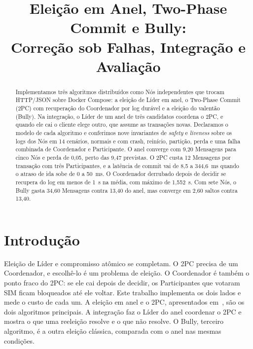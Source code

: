 \documentclass[conference]{IEEEtran}
\begin{document}
\title{Eleição em Anel, Two-Phase Commit e Bully:\\
Correção sob Falhas, Integração e Avaliação}

\author{
}

\maketitle

\begin{abstract}
Implementamos três algoritmos distribuídos como Nós independentes que trocam HTTP/JSON sobre
Docker Compose: a eleição de Líder em anel, o Two-Phase Commit (2PC) com recuperação do
Coordenador por log durável e a eleição do valentão (Bully). Na integração, o Líder de um anel de
três candidatos coordena o 2PC, e quando ele cai o cliente elege outro, que assume as transações
novas. Declaramos o modelo de cada algoritmo e conferimos nove invariantes de \emph{safety} e
\emph{liveness} sobre os logs dos Nós em 14 cenários, normais e com crash, reinício, partição,
perda e uma falha combinada de Coordenador e Participante. O anel converge com 9,20 Mensagens
para cinco Nós e perda de 0,05, perto das 9,47 previstas. O 2PC custa 12 Mensagens por transação
com três Participantes, e a latência de commit vai de 8,5 a 344,6~ms quando o atraso de ida sobe
de 0 a 50~ms. O Coordenador derrubado depois de decidir se recupera do log em menos de 1~s na
média, com máximo de 1,552~s. Com sete Nós, o Bully gasta 34,60 Mensagens contra 13,40 do anel,
mas converge em 2,60 saltos contra 13,40.
\end{abstract}

\section{Introdução}
\label{sec:intro}
Eleição de Líder e compromisso atômico se completam. O 2PC precisa de um Coordenador, e
escolhê-lo é um problema de eleição. O Coordenador é também o ponto fraco do 2PC: se ele cai
depois de decidir, os Participantes que votaram SIM ficam bloqueados até ele voltar. Este trabalho
implementa os dois lados e mede o custo de cada um. A eleição em anel e o 2PC, apresentados
em~\cite{vansteen}, são os dois algoritmos principais. A integração faz o Líder do anel coordenar
o 2PC e mostra o que uma reeleição resolve e o que não resolve. O Bully, terceiro algoritmo, é a
outra eleição clássica, comparada com o anel nas mesmas condições.
\end{document}
